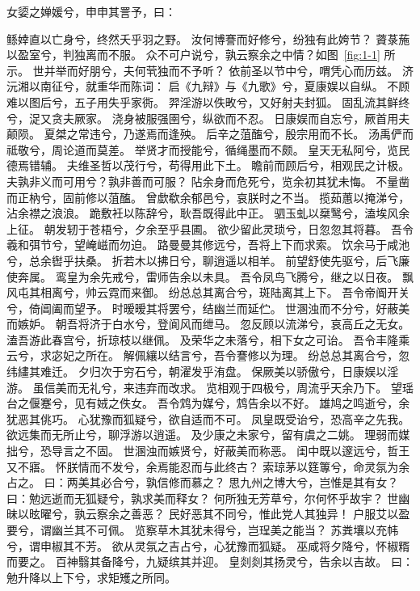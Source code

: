 女媭之婵媛兮，申申其詈予，曰：

鲧婞直以亡身兮，终然夭乎羽之野。
汝何博謇而好修兮，纷独有此姱节？
薋菉葹以盈室兮，判独离而不服。
众不可户说兮，孰云察余之中情？如图~\ref{fig:1-1} 所示。
世并举而好朋兮，夫何茕独而不予听？
依前圣以节中兮，喟凭心而历兹。
济沅湘以南征兮，就重华而陈词：
启《九辩》与《九歌》兮，夏康娱以自纵。
不顾难以图后兮，五子用失乎家衖。
羿淫游以佚畋兮，又好射夫封狐。
固乱流其鲜终兮，浞又贪夫厥家。
浇身被服强圉兮，纵欲而不忍。
日康娱而自忘兮，厥首用夫颠陨。
夏桀之常违兮，乃遂焉而逢殃。
后辛之菹醢兮，殷宗用而不长。
汤禹俨而祗敬兮，周论道而莫差。
举贤才而授能兮，循绳墨而不颇。
皇天无私阿兮，览民德焉错辅。
夫维圣哲以茂行兮，苟得用此下土。
瞻前而顾后兮，相观民之计极。
夫孰非义而可用兮？孰非善而可服？
阽余身而危死兮，览余初其犹未悔。
不量凿而正枘兮，固前修以菹醢。
曾歔欷余郁邑兮，哀朕时之不当。
揽茹蕙以掩涕兮，沾余襟之浪浪。
跪敷衽以陈辞兮，耿吾既得此中正。
驷玉虬以椉鹥兮，溘埃风余上征。\cite{LiuDongLing2025,MaJie2025}
朝发轫于苍梧兮，夕余至乎县圃。
欲少留此灵琐兮，日忽忽其将暮。
吾令羲和弭节兮，望崦嵫而勿迫。
路曼曼其修远兮，吾将上下而求索。
饮余马于咸池兮，总余辔乎扶桑。
折若木以拂日兮，聊逍遥以相羊。
前望舒使先驱兮，后飞廉使奔属。
鸾皇为余先戒兮，雷师告余以未具。
吾令凤鸟飞腾兮，继之以日夜。
飘风屯其相离兮，帅云霓而来御。
纷总总其离合兮，斑陆离其上下。
吾令帝阍开关兮，倚阊阖而望予。
时暧暧其将罢兮，结幽兰而延伫。
世溷浊而不分兮，好蔽美而嫉妒。
朝吾将济于白水兮，登阆风而绁马。
忽反顾以流涕兮，哀高丘之无女。
溘吾游此春宫兮，折琼枝以继佩。
及荣华之未落兮，相下女之可诒。
吾令丰隆乘云兮，求宓妃之所在。\cite{pribyl2025a}
解佩纕以结言兮，吾令謇修以为理。
纷总总其离合兮，忽纬繣其难迁。
夕归次于穷石兮，朝濯发乎洧盘。
保厥美以骄傲兮，日康娱以淫游。
虽信美而无礼兮，来违弃而改求。
览相观于四极兮，周流乎天余乃下。
望瑶台之偃蹇兮，见有娀之佚女。
吾令鸩为媒兮，鸩告余以不好。
雄鸠之鸣逝兮，余犹恶其佻巧。
心犹豫而狐疑兮，欲自适而不可。
凤皇既受诒兮，恐高辛之先我。
欲远集而无所止兮，聊浮游以逍遥。
及少康之未家兮，留有虞之二姚。
理弱而媒拙兮，恐导言之不固。
世溷浊而嫉贤兮，好蔽美而称恶。
闺中既以邃远兮，哲王又不寤。
怀朕情而不发兮，余焉能忍而与此终古？
索琼茅以筳篿兮，命灵氛为余占之。
曰：两美其必合兮，孰信修而慕之？
思九州之博大兮，岂惟是其有女？
曰：勉远逝而无狐疑兮，孰求美而释女？
何所独无芳草兮，尔何怀乎故宇？
世幽昧以昡曜兮，孰云察余之善恶？
民好恶其不同兮，惟此党人其独异！
户服艾以盈要兮，谓幽兰其不可佩。
览察草木其犹未得兮，岂珵美之能当？
苏粪壤以充帏兮，谓申椒其不芳。
欲从灵氛之吉占兮，心犹豫而狐疑。
巫咸将夕降兮，怀椒糈而要之。
百神翳其备降兮，九疑缤其并迎。
皇剡剡其扬灵兮，告余以吉故。
曰：勉升降以上下兮，求矩矱之所同。
